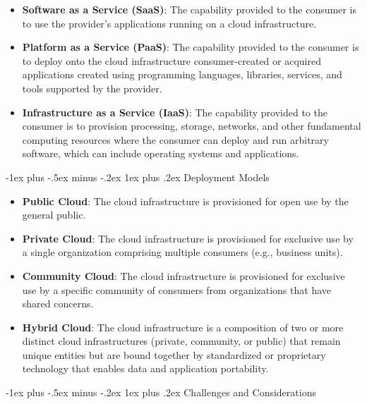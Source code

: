 \documentclass[10pt, landscape]{article}
\makeatletter
\renewcommand{\subsubsection}{\@startsection{subsubsection}{3}{0mm}%
  {-1ex plus -.5ex minus -.2ex}%
  {1ex plus .2ex}%
{\normalfont\small\bfseries}}%
\makeatother
\begin{document}
\begin{multicols*}{4}
\begin{itemize}
\tightlist
\item
  \textbf{Software as a Service (SaaS)}: The capability provided to the
  consumer is to use the provider's applications running on a cloud
  infrastructure.
\item
  \textbf{Platform as a Service (PaaS)}: The capability provided to the
  consumer is to deploy onto the cloud infrastructure consumer-created
  or acquired applications created using programming languages,
  libraries, services, and tools supported by the provider.
\item
  \textbf{Infrastructure as a Service (IaaS)}: The capability provided
  to the consumer is to provision processing, storage, networks, and
  other fundamental computing resources where the consumer can deploy
  and run arbitrary software, which can include operating systems and
  applications.
\end{itemize}

\subsubsection{Deployment Models}\label{deployment-models}

\begin{itemize}
\tightlist
\item
  \textbf{Public Cloud}: The cloud infrastructure is provisioned for
  open use by the general public.
\item
  \textbf{Private Cloud}: The cloud infrastructure is provisioned for
  exclusive use by a single organization comprising multiple consumers
  (e.g., business units).
\item
  \textbf{Community Cloud}: The cloud infrastructure is provisioned for
  exclusive use by a specific community of consumers from organizations
  that have shared concerns.
\item
  \textbf{Hybrid Cloud}: The cloud infrastructure is a composition of
  two or more distinct cloud infrastructures (private, community, or
  public) that remain unique entities but are bound together by
  standardized or proprietary technology that enables data and
  application portability.
\end{itemize}

\subsubsection{Challenges and
Considerations}\label{challenges-and-considerations}


\end{multicols*}
\end{document}
